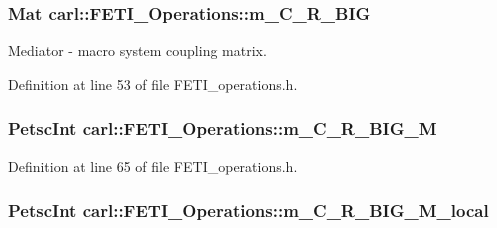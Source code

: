 \subsubsection[{m\+\_\+\+C\+\_\+\+R\+\_\+\+B\+I\+G}]{\setlength{\rightskip}{0pt plus 5cm}Mat carl\+::\+F\+E\+T\+I\+\_\+\+Operations\+::m\+\_\+\+C\+\_\+\+R\+\_\+\+B\+I\+G\hspace{0.3cm}{\ttfamily [protected]}}\label{classcarl_1_1_f_e_t_i___operations_a397d6a5e3e4111e06bb1ec52abdc6fa8}


Mediator -\/ macro system coupling matrix. 



Definition at line 53 of file F\+E\+T\+I\+\_\+operations.\+h.

\hypertarget{classcarl_1_1_f_e_t_i___operations_a8c26f1927c4b8825fe96ddfa51410c56}{}
\subsubsection[{m\+\_\+\+C\+\_\+\+R\+\_\+\+B\+I\+G\+\_\+\+M}]{\setlength{\rightskip}{0pt plus 5cm}Petsc\+Int carl\+::\+F\+E\+T\+I\+\_\+\+Operations\+::m\+\_\+\+C\+\_\+\+R\+\_\+\+B\+I\+G\+\_\+\+M\hspace{0.3cm}{\ttfamily [protected]}}\label{classcarl_1_1_f_e_t_i___operations_a8c26f1927c4b8825fe96ddfa51410c56}


Definition at line 65 of file F\+E\+T\+I\+\_\+operations.\+h.

\hypertarget{classcarl_1_1_f_e_t_i___operations_adb43af921deb83b507b3af27d7ac2e1f}{}
\subsubsection[{m\+\_\+\+C\+\_\+\+R\+\_\+\+B\+I\+G\+\_\+\+M\+\_\+local}]{\setlength{\rightskip}{0pt plus 5cm}Petsc\+Int carl\+::\+F\+E\+T\+I\+\_\+\+Operations\+::m\+\_\+\+C\+\_\+\+R\+\_\+\+B\+I\+G\+\_\+\+M\+\_\+local\hspace{0.3cm}{\ttfamily [protected]}}\label{classcarl_1_1_f_e_t_i___operations_adb43af921deb83b507b3af27d7ac2e1f}


